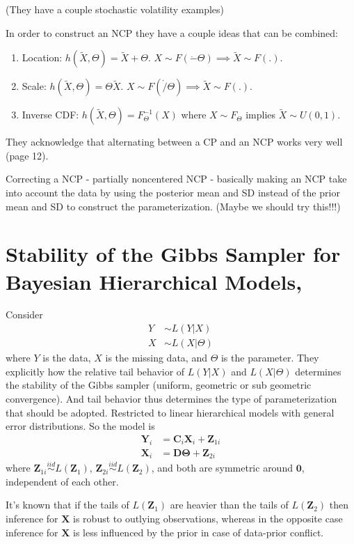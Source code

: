 \documentclass{article}\usepackage[]{graphicx}\usepackage[]{color}
\begin{document}
(They have a couple stochastic volatility examples)

In order to construct an NCP they have a couple ideas that can be combined:
\begin{enumerate}
  \item Location: $h(\tilde{X},\Theta) = \tilde{X} + \Theta$. $X\sim F(\dot - \Theta) \implies \tilde{X} \sim F(.)$.
  \item Scale: $h(\tilde{X},\Theta) = \Theta\tilde{X}$. $X\sim F(\dot / \Theta) \implies \tilde{X} \sim F(.)$.
  \item Inverse CDF: $h(\tilde{X},\Theta) = F_\Theta^{-1}(X)$ where $X\sim F_\Theta$ implies $\tilde{X}\sim U(0,1)$.
\end{enumerate}

They acknowledge that alternating between a CP and an NCP works very well (page 12).

Correcting a NCP - partially noncentered NCP - basically making an NCP take into account the data by using the posterior mean and SD instead of the prior mean and SD to construct the parameterization. (Maybe we should try this!!!)

\section{Stability of the Gibbs Sampler for Bayesian Hierarchical Models, \citet{papaspiliopoulos2008stability}}
Consider
\begin{align*}
  Y & \sim L(Y|X)\\
  X & \sim L(X|\Theta)
\end{align*}
where $Y$ is the data, $X$ is the missing data, and $\Theta$ is the parameter. They explicitly how the relative tail behavior of $L(Y|X)$ and $L(X|\Theta)$ determines the stability of the Gibbs sampler (uniform, geometric or sub geometric convergence). And tail behavior thus determines the type of parameterization that should be adopted. Restricted to linear hierarchical models with general error distributions. So the model is
\begin{align*}
  \bm{Y}_i &= \bm{C}_i\bm{X}_i + \bm{Z}_{1i}\\
  \bm{X}_i &= \bm{D}\bm{\Theta} + \bm{Z}_{2i}
\end{align*}
where $\bm{Z}_{1i}\stackrel{iid}{\sim} L(\bm{Z}_1)$, $\bm{Z}_{2i}\stackrel{iid}{\sim} L(\bm{Z}_2)$, and both are symmetric around $\bm{0}$, independent of each other.

It's known that if the tails of $L(\bm{Z}_1)$ are heavier than the tails of $L(\bm{Z}_2)$ then inference for $\bm{X}$ is robust to outlying observations, whereas in the opposite case inference for $\bm{X}$ is less influenced by the prior in case of data-prior conflict.
\end{document}
